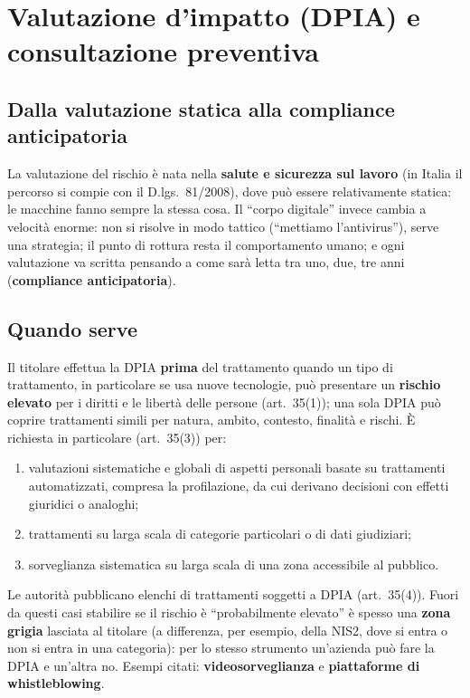 \section{Valutazione d'impatto (DPIA) e consultazione preventiva}
\label{sec:gdpr-dpia}

\subsection{Dalla valutazione statica alla compliance anticipatoria}
La valutazione del rischio è nata nella \textbf{salute e sicurezza sul lavoro} (in Italia il percorso si
compie con il D.lgs.~81/2008), dove può essere relativamente statica: le macchine fanno sempre la stessa
cosa. Il ``corpo digitale'' invece cambia a velocità enorme: non si risolve in modo tattico (``mettiamo
l'antivirus''), serve una strategia; il punto di rottura resta il comportamento umano; e ogni valutazione
va scritta pensando a come sarà letta tra uno, due, tre anni (\textbf{compliance anticipatoria}).

\subsection{Quando serve}
Il titolare effettua la DPIA \textbf{prima} del trattamento quando un tipo di trattamento, in particolare
se usa nuove tecnologie, può presentare un \textbf{rischio elevato} per i diritti e le libertà delle
persone (art.~35(1)); una sola DPIA può coprire trattamenti simili per natura, ambito, contesto, finalità
e rischi. È richiesta in particolare (art.~35(3)) per:
\begin{enumerate}[label=(\alph*)]
  \item valutazioni sistematiche e globali di aspetti personali basate su trattamenti automatizzati,
    compresa la profilazione, da cui derivano decisioni con effetti giuridici o analoghi;
  \item trattamenti su larga scala di categorie particolari o di dati giudiziari;
  \item sorveglianza sistematica su larga scala di una zona accessibile al pubblico.
\end{enumerate}
Le autorità pubblicano elenchi di trattamenti soggetti a DPIA (art.~35(4)). Fuori da questi casi
stabilire se il rischio è ``probabilmente elevato'' è spesso una \textbf{zona grigia} lasciata al titolare
(a differenza, per esempio, della NIS2, dove si entra o non si entra in una categoria): per lo stesso
strumento un'azienda può fare la DPIA e un'altra no. Esempi citati: \textbf{videosorveglianza} e
\textbf{piattaforme di whistleblowing}.

